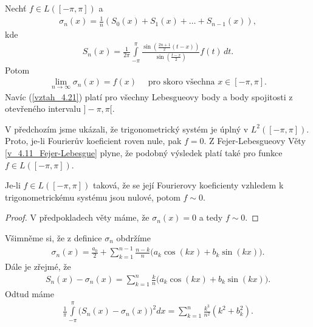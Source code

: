 \begin{theorem}\label{v_4.11_Fejer-Lebesgue}
Nechť $f\in L([-\pi, \pi])$ a 
\begin{align*}
\sigma_n (x) = \frac{1}{n} ( S_0(x) + S_1(x) + \ldots + S_{n-1}(x)),
\end{align*}
kde \begin{align*}
S_n(x) = \frac{1}{2\pi} \int \limits_{-\pi}^\pi \frac{\sin \left(\frac{2n+1}{2}(t-x) \right)}{\sin \left( \frac{t-x}{2} \right)} f(t) \, dt.
\end{align*}
Potom
\begin{align}\label{vztah_4.21}
\lim_{n \rightarrow \infty} \sigma_n (x) = f(x) \quad \textrm{ pro skoro všechna } x \in [-\pi, \pi].
\end{align}
Navíc (\eqref{vztah_4.21}) platí pro všechny Lebesgueovy body a body spojitosti z otevřeného intervalu $]-\pi, \pi[$.
\end{theorem}

\begin{poznamka}\label{p_4.12}
V předchozím jsme ukázali, že trigonometrický systém je úplný v $L^2([-\pi, \pi])$. Proto, je-li Fourierův koeficient roven nule, pak $f = 0$. Z Fejer-Lebesgueovy Věty \ref{v_4.11_Fejer-Lebesgue} plyne, že podobný výsledek platí také pro funkce $f \in L([-\pi, \pi])$.
\end{poznamka}

\begin{theorem}\label{v_4.12}
Je-li $f \in L([-\pi, \pi])$ taková, že se její Fourierovy koeficienty vzhledem k trigonometrickému systému jsou nulové, potom $f \sim 0$.
\begin{proof}
V předpokladech věty máme, že $\sigma_n (x) = 0$ a tedy $f \sim 0$.
\end{proof}
\end{theorem}

\begin{poznamka}\label{p_4.13.poznamka}
Všimněme si, že z definice $\sigma_n$ obdržíme
\begin{align*}
\sigma_n (x) = \frac{a_0}{2} + \sum \limits _{k=1}^{n-1} \frac{n-k}{n} \Big(a_k \cos (kx) + b_k \sin (kx)\Big).
\end{align*}
Dále je zřejmé, že
\begin{align}\label{vztah_4.22}
S_n (x) - \sigma_n (x) = \sum \limits _{k=1}^n \frac{k}{n} \Big(a_k \cos (kx) + b_k \sin (kx)\Big).
\end{align}
Odtud máme
\begin{align}\label{vztah_4.23}
\frac{1}{\pi} \int \limits_{-\pi}^\pi \Big(S_n (x) - \sigma_n (x) \big)^2 dx = \sum \limits _{k=1}^n \frac{k^3}{n^2}(k^2 + b_k^2).
\end{align}
\end{poznamka}

